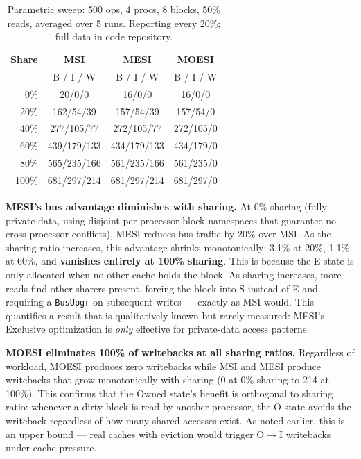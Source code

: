 \documentclass[10pt,twocolumn]{article}
\begin{document}
\begin{table}[h]
\centering
\caption{Parametric sweep: 500 ops, 4 procs, 8 blocks, 50\% reads, averaged over 5 runs. Reporting every 20\%; full data in code repository.}
\label{tab:parametric}
\footnotesize
\begin{tabular}{@{}rccc@{}}
\toprule
\textbf{Share} & \textbf{MSI} & \textbf{MESI} & \textbf{MOESI} \\
 & B / I / W & B / I / W & B / I / W \\
\midrule
0\%   & 20/0/0     & 16/0/0     & 16/0/0 \\
20\%  & 162/54/39  & 157/54/39  & 157/54/0 \\
40\%  & 277/105/77 & 272/105/77 & 272/105/0 \\
60\%  & 439/179/133 & 434/179/133 & 434/179/0 \\
80\%  & 565/235/166 & 561/235/166 & 561/235/0 \\
100\% & 681/297/214 & 681/297/214 & 681/297/0 \\
\bottomrule
\end{tabular}
\end{table}

\textbf{MESI's bus advantage diminishes with sharing.} At 0\% sharing (fully private data, using disjoint per-processor block namespaces that guarantee no cross-processor conflicts), MESI reduces bus traffic by 20\% over MSI. As the sharing ratio increases, this advantage shrinks monotonically: 3.1\% at 20\%, 1.1\% at 60\%, and \textbf{vanishes entirely at 100\% sharing}. This is because the E state is only allocated when no other cache holds the block. As sharing increases, more reads find other sharers present, forcing the block into S instead of E and requiring a \texttt{BusUpgr} on subsequent writes --- exactly as MSI would. This quantifies a result that is qualitatively known but rarely measured: MESI's Exclusive optimization is \emph{only} effective for private-data access patterns.

\textbf{MOESI eliminates 100\% of writebacks at all sharing ratios.} Regardless of workload, MOESI produces zero writebacks while MSI and MESI produce writebacks that grow monotonically with sharing (0 at 0\% sharing to 214 at 100\%). This confirms that the Owned state's benefit is orthogonal to sharing ratio: whenever a dirty block is read by another processor, the O state avoids the writeback regardless of how many shared accesses exist. As noted earlier, this is an upper bound --- real caches with eviction would trigger O$\to$I writebacks under cache pressure.
\end{document}
